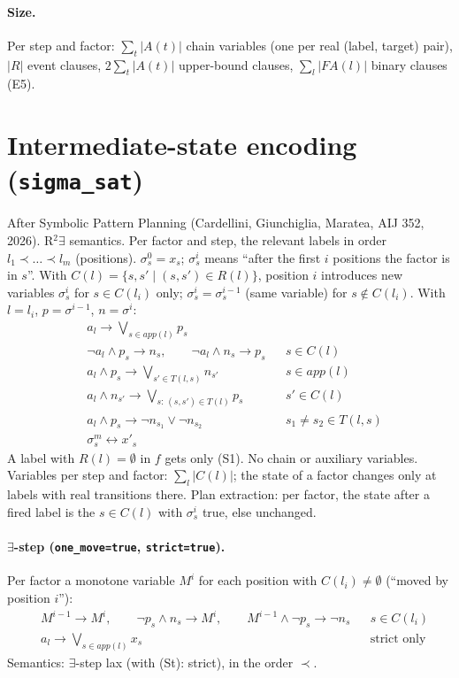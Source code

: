 \documentclass[11pt,a4paper]{article}
\newcommand{\lab}[1]{a_{#1}}            %
\newcommand{\st}[1]{x_{#1}}             %
\newcommand{\stn}[1]{x'_{#1}}           %
\newcommand{\R}{R}
\newcommand{\app}{\mathit{app}}
\newcommand{\FA}{\mathit{FA}}
\begin{document}
\paragraph{Size.} Per step and factor: $\sum_t |A(t)|$ chain variables (one per real
(label, target) pair), $|\R|$ event clauses, $2\sum_t|A(t)|$ upper-bound clauses,
$\sum_l |\FA(l)|$ binary clauses (E5).

\section{Intermediate-state encoding (\texttt{sigma\_sat})}

After Symbolic Pattern Planning (Cardellini, Giunchiglia, Maratea, AIJ 352, 2026). R$^2\exists$
semantics. Per factor and step, the relevant labels in order $l_1 \prec \dots \prec l_m$
(positions). $\sigma^0_s = \st{s}$; $\sigma^i_s$ means ``after the first $i$ positions the factor is
in $s$''. With $C(l) = \{s, s' \mid (s,s') \in \R(l)\}$, position $i$ introduces new variables
$\sigma^i_s$ for $s \in C(l_i)$ only; $\sigma^i_s = \sigma^{i-1}_s$ (same variable) for
$s \notin C(l_i)$. With $l = l_i$, $p = \sigma^{i-1}$, $n = \sigma^i$:
\begin{align}
  &\lab{l} \to \textstyle\bigvee_{s \in \app(l)} p_s \tag{S1}\\
  &\neg\lab{l} \wedge p_s \to n_s,\qquad \neg\lab{l} \wedge n_s \to p_s && s \in C(l) \tag{S2}\\
  &\lab{l} \wedge p_s \to \textstyle\bigvee_{s' \in T(l,s)} n_{s'} && s \in \app(l) \tag{S3}\\
  &\lab{l} \wedge n_{s'} \to \textstyle\bigvee_{s:\,(s,s') \in T(l)} p_s && s' \in C(l) \tag{S4}\\
  &\lab{l} \wedge p_s \to \neg n_{s_1} \vee \neg n_{s_2} && s_1 \neq s_2 \in T(l,s) \tag{S5}\\
  &\sigma^m_s \leftrightarrow \stn{s} \tag{S6}
\end{align}
A label with $\R(l) = \emptyset$ in $f$ gets only (S1). No chain or auxiliary variables.
Variables per step and factor: $\sum_l |C(l)|$; the state of a factor changes only at labels with
real transitions there. Plan extraction: per factor, the state after a fired label is the
$s \in C(l)$ with $\sigma^i_s$ true, else unchanged.

\paragraph{$\exists$-step (\texttt{one\_move=true}, \texttt{strict=true}).} Per factor a monotone
variable $M^i$ for each position with $C(l_i) \neq \emptyset$ (``moved by position $i$''):
\begin{align}
  &M^{i-1} \to M^i,\qquad \neg p_s \wedge n_s \to M^i,\qquad
   M^{i-1} \wedge \neg p_s \to \neg n_s && s \in C(l_i) \tag{M}\\
  &\lab{l} \to \textstyle\bigvee_{s \in \app(l)} \st{s} && \text{strict only} \tag{St}
\end{align}
Semantics: $\exists$-step lax (with (St): strict), in the order $\prec$.
\end{document}
